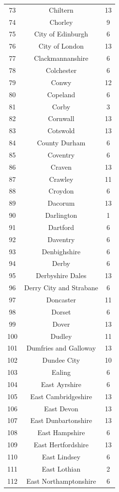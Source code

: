 \documentclass[Royal,times,sageh]{sagej}
\begin{document}
\begin{table}[!htbp]
\begin{tabular}{@{\extracolsep{5pt}} ccc}
73 & Chiltern & 13 \\ 
74 & Chorley & 9 \\ 
75 & City of Edinburgh & 6 \\ 
76 & City of London & 13 \\ 
77 & Clackmannanshire & 6 \\ 
78 & Colchester & 6 \\ 
79 & Conwy & 12 \\ 
80 & Copeland & 6 \\ 
81 & Corby & 3 \\ 
82 & Cornwall & 13 \\ 
83 & Cotswold & 13 \\ 
84 & County Durham & 6 \\ 
85 & Coventry & 6 \\ 
86 & Craven & 13 \\ 
87 & Crawley & 11 \\ 
88 & Croydon & 6 \\ 
89 & Dacorum & 13 \\ 
90 & Darlington & 1 \\ 
91 & Dartford & 6 \\ 
92 & Daventry & 6 \\ 
93 & Denbighshire & 6 \\ 
94 & Derby & 6 \\ 
95 & Derbyshire Dales & 13 \\ 
96 & Derry City and Strabane & 6 \\ 
97 & Doncaster & 11 \\ 
98 & Dorset & 6 \\ 
99 & Dover & 13 \\ 
100 & Dudley & 11 \\ 
101 & Dumfries and Galloway & 13 \\ 
102 & Dundee City & 10 \\ 
103 & Ealing & 6 \\ 
104 & East Ayrshire & 6 \\ 
105 & East Cambridgeshire & 13 \\ 
106 & East Devon & 13 \\ 
107 & East Dunbartonshire & 13 \\ 
108 & East Hampshire & 6 \\ 
109 & East Hertfordshire & 13 \\ 
110 & East Lindsey & 6 \\ 
111 & East Lothian & 2 \\ 
112 & East Northamptonshire & 6 \\ 

\end{tabular}
\end{table}
\end{document}
